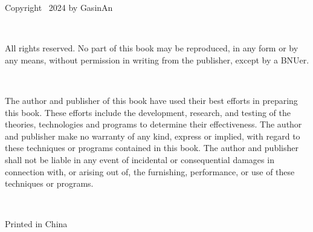 \noindent Copyright \textcopyright~2024 by GasinAn

\ 

\noindent All rights reserved. No part of this book may be reproduced, 
in any form or by any means, without permission in writing from the publisher, except by a BNUer.

\ 

\noindent The author and publisher of this book have used their best efforts
in preparing this book. These efforts include the development, research, and testing of the theories,
technologies and programs to determine their effectiveness.
The author and publisher make no warranty of any kind, express or implied,
with regard to these techniques or programs contained in this book.
The author and publisher shall not be liable in any event of incidental or consequential damages
in connection with, or arising out of, the furnishing, performance, or use of these techniques or programs.

\ 

\noindent Printed in China

